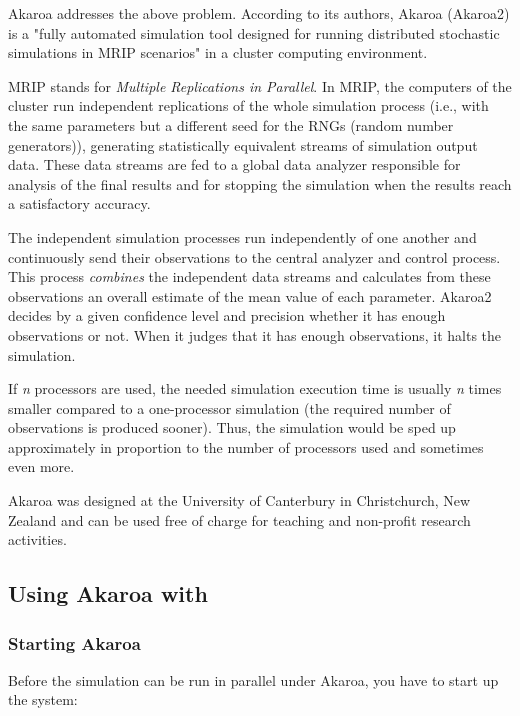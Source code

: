 Akaroa \cite{Akaroa99} addresses the above problem.
According to its authors, Akaroa (Akaroa2) is a "fully automated
simulation tool designed for running distributed stochastic simulations
in MRIP scenarios" in a cluster computing environment.

MRIP stands for \textit{Multiple Replications in Parallel}.
In MRIP, the computers of the cluster run independent replications
of the whole simulation process (i.e., with the same parameters but
a different seed for the RNGs (random number generators)),
generating statistically equivalent streams of simulation output data.
These data streams are fed to a global data analyzer responsible for
analysis of the final results and for stopping the simulation
when the results reach a satisfactory accuracy.

The independent simulation processes run independently of one another
and continuously send their observations to the central analyzer
and control process. This process \textit{combines} the independent data streams
and calculates from these observations an overall estimate of the mean value
of each parameter.
Akaroa2 decides by a given confidence level and precision
whether it has enough observations or not. When it judges that it
has enough observations, it halts the simulation.

If \textit{n} processors are used, the needed simulation execution time
is usually \textit{n} times smaller compared to a one-processor
simulation (the required number of observations is produced sooner).
Thus, the simulation would be sped up approximately in proportion
to the number of processors used and sometimes even more.

Akaroa was designed at the University of Canterbury in Christchurch, New Zealand
and can be used free of charge for teaching and non-profit research activities.


\subsection{Using Akaroa with {\opp}}
\label{sec:run-sim:using-akaroa}

\subsubsection{Starting Akaroa}
\label{sec:run-sim:starting-up-akaroa}

Before the simulation can be run in parallel under Akaroa, you have to
start up the system:

